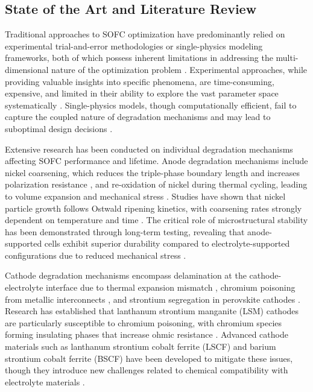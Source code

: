 \documentclass[conference]{IEEEtran}
\begin{document}
\subsection{State of the Art and Literature Review}

Traditional approaches to SOFC optimization have predominantly relied on experimental trial-and-error methodologies or single-physics modeling frameworks, both of which possess inherent limitations in addressing the multi-dimensional nature of the optimization problem \cite{Greco2014}. Experimental approaches, while providing valuable insights into specific phenomena, are time-consuming, expensive, and limited in their ability to explore the vast parameter space systematically \cite{Kendall2010}. Single-physics models, though computationally efficient, fail to capture the coupled nature of degradation mechanisms and may lead to suboptimal design decisions \cite{Fang2015}.

Extensive research has been conducted on individual degradation mechanisms affecting SOFC performance and lifetime. Anode degradation mechanisms include nickel coarsening, which reduces the triple-phase boundary length and increases polarization resistance \cite{Hauch2006}, and re-oxidation of nickel during thermal cycling, leading to volume expansion and mechanical stress \cite{Waldbillig2005}. Studies have shown that nickel particle growth follows Ostwald ripening kinetics, with coarsening rates strongly dependent on temperature and time \cite{Holzer2011}. The critical role of microstructural stability has been demonstrated through long-term testing, revealing that anode-supported cells exhibit superior durability compared to electrolyte-supported configurations due to reduced mechanical stress \cite{Blum2005}.

Cathode degradation mechanisms encompass delamination at the cathode-electrolyte interface due to thermal expansion mismatch \cite{Simwonis2000}, chromium poisoning from metallic interconnects \cite{Jiang2006}, and strontium segregation in perovskite cathodes \cite{Bucher2008}. Research has established that lanthanum strontium manganite (LSM) cathodes are particularly susceptible to chromium poisoning, with chromium species forming insulating phases that increase ohmic resistance \cite{Komatsu2009}. Advanced cathode materials such as lanthanum strontium cobalt ferrite (LSCF) and barium strontium cobalt ferrite (BSCF) have been developed to mitigate these issues, though they introduce new challenges related to chemical compatibility with electrolyte materials \cite{Shao2004}.
\end{document}
